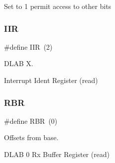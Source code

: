 Set to 1 permit access to other bits \mbox{\label{group__i386__uart_ga67004975983f9c99226d63db17ba74c4}} 
\subsubsection{\texorpdfstring{IIR}{IIR}}
{\footnotesize\ttfamily \#define I\+IR~(2)}



D\+L\+AB X. 

Interrupt Ident Register (read) \mbox{\label{group__i386__uart_gaa6f7e7a9f4551d6151f9d45362118a50}} 
\subsubsection{\texorpdfstring{RBR}{RBR}}
{\footnotesize\ttfamily \#define R\+BR~(0)}



Offsets from base. 

D\+L\+AB 0 Rx Buffer Register (read) 